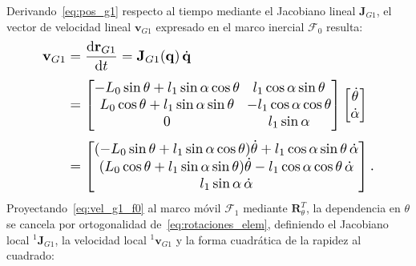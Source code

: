 Derivando~\eqref{eq:pos_g1} respecto al tiempo mediante el Jacobiano lineal $\mathbf{J}_{G1}$, el vector de velocidad lineal $\mathbf{v}_{G1}$ expresado en el marco inercial $\mathcal{F}_0$ resulta:
\begin{equation}
\resizebox{0.86\columnwidth}{!}{$\displaystyle
    \setlength{\arraycolsep}{2.5pt}
    \begin{aligned}
        \mathbf{v}_{G1} &= \frac{\mathrm{d}\mathbf{r}_{G1}}{\mathrm{d}t} = \mathbf{J}_{G1}(\mathbf{q})\,\dot{\mathbf{q}} \\[3pt]
        &= \begin{bmatrix}
            -L_0\sin\theta + l_1\sin\alpha\cos\theta & l_1\cos\alpha\sin\theta \\
            L_0\cos\theta + l_1\sin\alpha\sin\theta & -l_1\cos\alpha\cos\theta \\
            0 & l_1\sin\alpha
        \end{bmatrix}
        \begin{bmatrix} \dot{\theta} \\ \dot{\alpha} \end{bmatrix} \\[3pt]
        &= \begin{bmatrix}
            (-L_0\sin\theta + l_1\sin\alpha\cos\theta)\dot{\theta} + l_1\cos\alpha\sin\theta\,\dot{\alpha} \\
            (L_0\cos\theta + l_1\sin\alpha\sin\theta)\dot{\theta} - l_1\cos\alpha\cos\theta\,\dot{\alpha} \\
            l_1\sin\alpha\,\dot{\alpha}
        \end{bmatrix}.
    \end{aligned}
$}
    \label{eq:vel_g1_f0}
\end{equation}
Proyectando~\eqref{eq:vel_g1_f0} al marco móvil $\mathcal{F}_1$ mediante $\mathbf{R}_\theta^T$, la dependencia en $\theta$ se cancela por ortogonalidad de~\eqref{eq:rotaciones_elem}, definiendo el Jacobiano local ${}^{1}\mathbf{J}_{G1}$, la velocidad local ${}^{1}\mathbf{v}_{G1}$ y la forma cuadrática de la rapidez al cuadrado:
